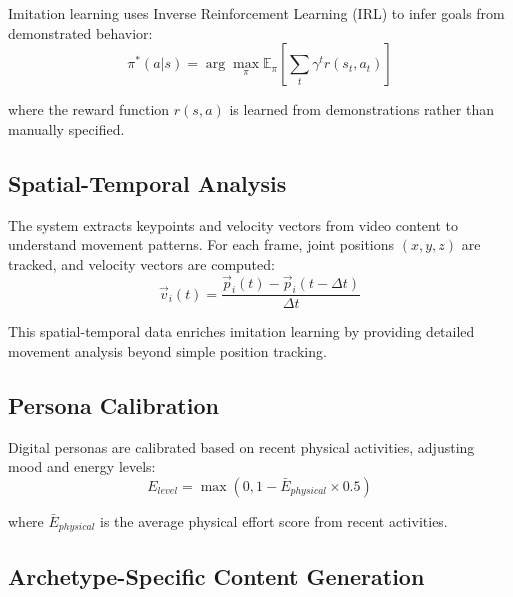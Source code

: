 \documentclass[12pt,a4paper]{article}
\begin{document}
Imitation learning uses Inverse Reinforcement Learning (IRL) to infer goals from demonstrated behavior:
\begin{equation}
\pi^*(a|s) = \arg\max_\pi \mathbb{E}_{\pi}[\sum_t \gamma^t r(s_t, a_t)]
\end{equation}

where the reward function $r(s,a)$ is learned from demonstrations rather than manually specified.

\subsection{Spatial-Temporal Analysis}

The system extracts keypoints and velocity vectors from video content to understand movement patterns. For each frame, joint positions $(x,y,z)$ are tracked, and velocity vectors are computed:
\begin{equation}
\vec{v}_i(t) = \frac{\vec{p}_i(t) - \vec{p}_i(t-\Delta t)}{\Delta t}
\end{equation}

This spatial-temporal data enriches imitation learning by providing detailed movement analysis beyond simple position tracking.

\subsection{Persona Calibration}

Digital personas are calibrated based on recent physical activities, adjusting mood and energy levels:
\begin{equation}
E_{level} = \max(0, 1 - \bar{E}_{physical} \times 0.5)
\end{equation}

where $\bar{E}_{physical}$ is the average physical effort score from recent activities.

\subsection{Archetype-Specific Content Generation}
\end{document}
